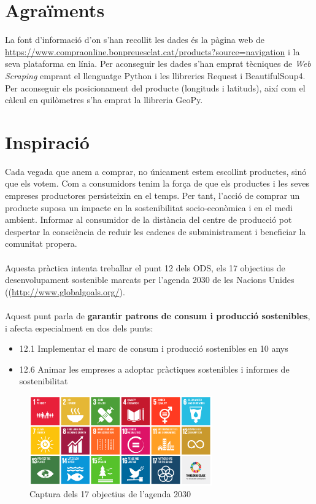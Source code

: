 \documentclass[]{scrartcl}
\begin{document}
\section{Agraïments}
La font d'informació d'on s'han recollit les dades és la pàgina web de \url{https://www.compraonline.bonpreuesclat.cat/products?source=navigation} i la seva plataforma en línia.  
Per aconseguir les dades s'han emprat tècniques de \textit{Web Scraping} emprant el llenguatge Python i les llibreries Request i BeautifulSoup4. Per aconseguir els posicionament del producte (longituds i latituds), així com el càlcul en quilòmetres s'ha emprat la llibreria GeoPy.


\section{Inspiració}
Cada vegada que anem a comprar, no únicament estem escollint productes, sinó que els votem. Com a consumidors tenim la força de que els productes i les seves empreses productores persisteixin en el temps. Per tant, l'acció de comprar un producte suposa un impacte en la sostenibilitat socio-econòmica i en el medi ambient. Informar al consumidor de la distància del centre de producció pot despertar la consciència de reduir les  cadenes de subministrament i beneficiar la comunitat propera.
\\\\
Aquesta pràctica intenta treballar el punt 12 dels ODS, els 17 objectius de desenvolupament sostenible marcats per l'agenda 2030 de les Nacions Unides ((\url{http://www.globalgoals.org/}).
\\\\
Aquest punt parla de \textbf{garantir patrons de consum i producció sostenibles}, i afecta especialment en dos dels punts:
\begin{itemize}
	\item 12.1 Implementar el marc de consum i producció sostenibles en 10 anys
	\item 12.6 Animar les empreses a adoptar pràctiques sostenibles i informes de sostenibilitat
\end{itemize} 
\begin{figure}[htb]
	\centering
	\includegraphics[width=0.7\textwidth]{globalgoals}
	\caption{Captura dels 17 objectius de l'agenda 2030}
\end{figure}
\end{document}
